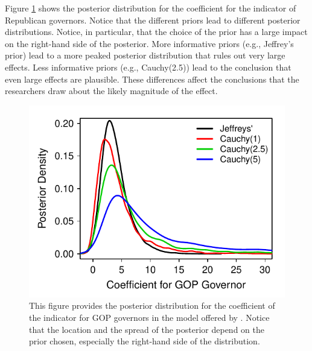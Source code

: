 \documentclass[12pt]{article}
\begin{document}
Figure \ref{fig:matters-post} shows the posterior distribution for the coefficient for the indicator of Republican governors. Notice that the different priors lead to different posterior distributions. Notice, in particular, that the choice of the prior has a large impact on the right-hand side of the posterior. More informative priors (e.g., Jeffrey's prior) lead to a more peaked posterior distribution that rules out very large effects. Less informative priors (e.g., Cauchy(2.5)) lead to the conclusion that even large effects are plausible. These differences affect the conclusions that the researchers draw about the likely magnitude of the effect.

\begin{figure}[H]
\begin{center}
\includegraphics[scale = .8]{figs/matters-post.pdf}
\caption{This figure provides the posterior distribution for the coefficient of the indicator for GOP governors in the model offered by \cite{BarrilleauxRainey2014}. Notice that the location and the spread of the posterior depend on the prior chosen, especially the right-hand side of the distribution.}\label{fig:matters-post}
\end{center}
\end{figure}
\end{document}
